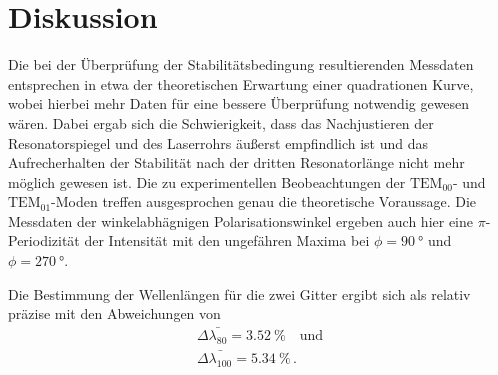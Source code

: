 \section{Diskussion}
\label{sec:Diskussion}

Die bei der Überprüfung der Stabilitätsbedingung resultierenden Messdaten entsprechen in etwa der theoretischen Erwartung
einer quadrationen Kurve, wobei hierbei mehr Daten für eine bessere Überprüfung notwendig gewesen wären.
Dabei ergab sich die Schwierigkeit, 
dass das Nachjustieren der Resonatorspiegel und des Laserrohrs äußerst empfindlich ist
und das Aufrecherhalten der Stabilität nach der dritten Resonatorlänge nicht mehr möglich gewesen ist.
Die zu experimentellen Beobeachtungen der $\text{TEM}_{00}$- und $\text{TEM}_{01}$-Moden treffen ausgesprochen genau die
theoretische Voraussage. 
Die Messdaten der winkelabhägnigen Polarisationswinkel ergeben auch hier eine $\pi$-Periodizität der Intensität
mit den ungefähren Maxima bei $\phi = \qty{90}{\degree}$ und $\phi = \qty{270}{\degree}$.

Die Bestimmung der Wellenlängen für die zwei Gitter ergibt sich als relativ präzise mit den Abweichungen von
\begin{align*}
    \Delta \bar{\lambda_{80}} = \qty{3.52}{\percent} \quad \text{und} \\
    \Delta \bar{\lambda_{100}} = \qty{5.34}{\percent} \, .
\end{align*}